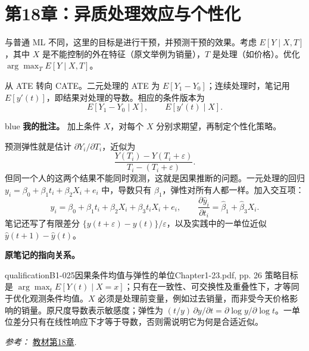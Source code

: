 {\section{第18章：异质处理效应与个性化}
与普通 ML 不同，这里的目标是进行干预，并预测干预的效果。考虑 $E[Y\mid X,T]$，其中 $X$ 是不能控制的外在特征（原文举例为销量），$T$ 是处理（如价格）。优化 $\arg\max_T E[Y\mid X,T]$。

从 ATE 转向 CATE。二元处理的 ATE 为 $E[Y_1-Y_0]$；连续处理时，笔记用 $E[y'(t)]$，即结果对处理的导数。相应的条件版本为
\[E[Y_1-Y_0\mid X],\qquad E[y'(t)\mid X].\]
\begin{inkblock}{blue}
\textbf{我的批注。} 加上条件 $X$，对每个 $X$ 分别求期望，再制定个性化策略。
\end{inkblock}

预测弹性就是估计 $\partial Y_i/\partial T_i$，近似为
\[\frac{Y(T_i)-Y(T_i+\varepsilon)}{T_i-(T_i+\varepsilon)}.\]
但同一个人的这两个结果不能同时观测，这就是因果推断的问题。一元处理的回归 $y_i=\beta_0+\beta_1t_i+\beta_2X_i+e_i$ 中，导数只有 $\beta_1$，弹性对所有人都一样。加入交互项：
\[y_i=\beta_0+\beta_1t_i+\beta_2X_i+\beta_3t_iX_i+e_i,
\qquad \frac{\partial\hat y_i}{\partial t_i}=\hat\beta_1+\hat\beta_3X_i.
\]
 笔记还写了有限差分 $\{y(t+\varepsilon)-y(t)\}/\varepsilon$，以及实践中的一单位近似 $\hat y(t+1)-\hat y(t)$。

\par{}\smallskip\textbf{原笔记的指向关系。}\par\smallskip
{}
\begin{reviewnote}{qualification}{B1-025}{因果条件均值与弹性的单位}{Chapter1-23.pdf, pp. 26}
策略目标是 $\arg\max_t E[Y(t)\mid X=x]$；只有在一致性、可交换性及重叠性下，才等同于优化观测条件均值。$X$ 必须是处理前变量，例如过去销量，而非受今天价格影响的销量。原尺度导数表示敏感度；弹性为 $(t/y)\,\partial y/\partial t=\partial\log y/\partial\log t$。一单位差分只有在线性响应下才等于导数，否则需说明它为何是合适近似。
\par\smallskip\textit{参考：} \href{https://matheusfacure.github.io/python-causality-handbook/18-Heterogeneous-Treatment-Effects-and-Personalization.html}{教材第18章}.
\end{reviewnote}
}
